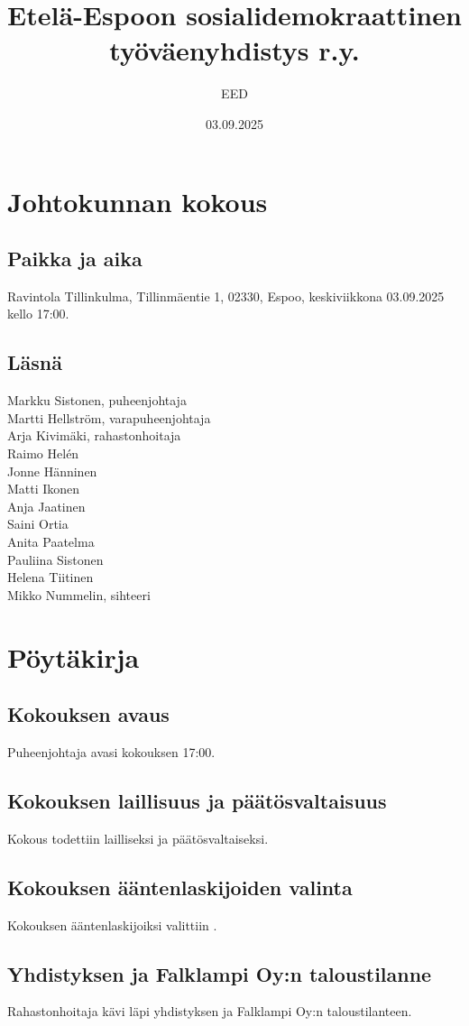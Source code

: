 \documentclass[a4paper,12pt]{article}
\title{Etelä-Espoon sosialidemokraattinen työväenyhdistys r.y.}
\author{EED}
\date{03.09.2025}
\begin{document}
\maketitle
\tableofcontents
\section*{Johtokunnan kokous}
\subsection*{Paikka ja aika}
Ravintola Tillinkulma, Tillinmäentie 1, 02330, Espoo, keskiviikkona 03.09.2025 kello 17:00.
\subsection*{Läsnä}
Markku Sistonen, puheenjohtaja \\
Martti Hellström, varapuheenjohtaja \\
Arja Kivimäki, rahastonhoitaja \\
Raimo Helén \\
Jonne Hänninen \\
Matti Ikonen \\
Anja Jaatinen \\
Saini Ortia \\
Anita Paatelma \\
Pauliina Sistonen \\
Helena Tiitinen \\
Mikko Nummelin, sihteeri
\section*{Pöytäkirja}
\subsection{Kokouksen avaus}
Puheenjohtaja avasi kokouksen 17:00.
\subsection{Kokouksen laillisuus ja päätösvaltaisuus}
Kokous todettiin lailliseksi ja päätösvaltaiseksi.
\subsection{Kokouksen ääntenlaskijoiden valinta}
Kokouksen ääntenlaskijoiksi valittiin .
\subsection{Yhdistyksen ja Falklampi Oy:n taloustilanne}
Rahastonhoitaja kävi läpi yhdistyksen ja Falklampi Oy:n taloustilanteen.
\end{document}
